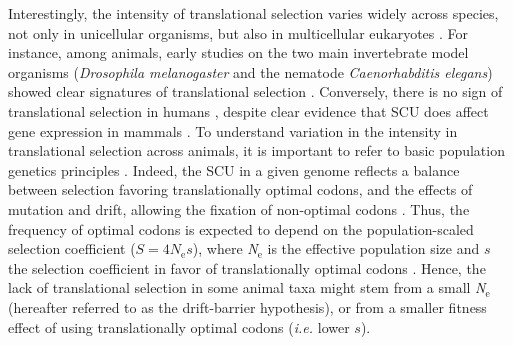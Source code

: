 Interestingly, the intensity of translational selection varies widely across species, not only in unicellular organisms, but also in multicellular eukaryotes \citep{sharp_variation_2005, subramanian_nearly_2008, dos_reis_estimating_2009, galtier_codon_2018}. For instance, among animals, early studies on the two main invertebrate model organisms (\textit{Drosophila melanogaster} and the nematode \textit{Caenorhabditis elegans}) showed clear signatures of translational selection \citep{shields_silent_1988, duret_expression_1999}. Conversely, there is no sign of translational selection in humans \citep{semon_no_2006, pouyet_recombination_2017}, despite clear evidence that SCU does affect gene expression in mammals \citep{kudla_high_2006, courel_gc_2019, wu_translation_2019, mordstein_codon_2020, medina-munoz_crosstalk_2021}. To understand variation in the intensity in translational selection across animals, it is important to refer to basic population genetics principles \citep{ohta_neutral_1996}. Indeed, the SCU in a given genome reflects a balance between selection favoring translationally optimal codons, and the effects of mutation and drift, allowing the fixation of non-optimal codons \citep{bulmer_selection-mutation-drift_1991}. Thus, the frequency of optimal codons is expected to depend on the population-scaled selection coefficient ($S=4\textit{N}_{\text{e}}s$), where \textit{N}$_{\text{e}}$ is the effective population size and $s$ the selection coefficient in favor of translationally optimal codons \citep{bulmer_selection-mutation-drift_1991, sharp_variation_2005}. Hence, the lack of translational selection in some animal taxa might stem from a small \textit{N}$_{\text{e}}$ (hereafter referred to as the drift-barrier hypothesis), or from a smaller fitness effect of using translationally optimal codons (\textit{i.e.} lower $s$).

